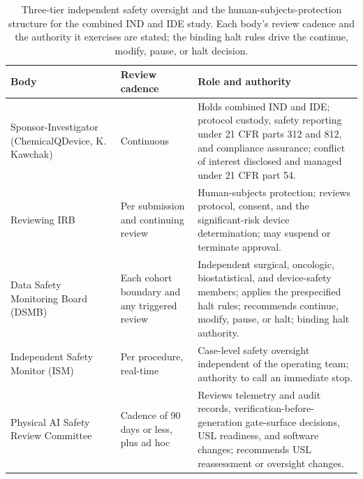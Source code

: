 \begin{table}[htbp]
\centering
\footnotesize
\caption{Three-tier independent safety oversight and the human-subjects-protection
structure for the combined IND and IDE study. Each body's review cadence and the
authority it exercises are stated; the binding halt rules drive the continue,
modify, pause, or halt decision.}
\label{tab:oversight-bodies}
\begin{tabularx}{\textwidth}{L{3.4cm} L{3.2cm} Y}
\toprule
\textbf{Body} & \textbf{Review cadence} & \textbf{Role and authority} \\
\midrule
Sponsor-Investigator (ChemicalQDevice, K. Kawchak) & Continuous & Holds combined IND and IDE; protocol custody, safety reporting under 21 CFR parts 312 and 812, and compliance assurance; conflict of interest disclosed and managed under 21 CFR part 54. \\
Reviewing IRB & Per submission and continuing review & Human-subjects protection; reviews protocol, consent, and the significant-risk device determination; may suspend or terminate approval. \\
Data Safety Monitoring Board (DSMB) & Each cohort boundary and any triggered review & Independent surgical, oncologic, biostatistical, and device-safety members; applies the prespecified halt rules; recommends continue, modify, pause, or halt; binding halt authority. \\
Independent Safety Monitor (ISM) & Per procedure, real-time & Case-level safety oversight independent of the operating team; authority to call an immediate stop. \\
Physical AI Safety Review Committee & Cadence of 90 days or less, plus ad hoc & Reviews telemetry and audit records, verification-before-generation gate-surface decisions, USL readiness, and software changes; recommends USL reassessment or oversight changes. \\
\bottomrule
\end{tabularx}
\end{table}
\vspace*{-0.75cm}

\clearpage

